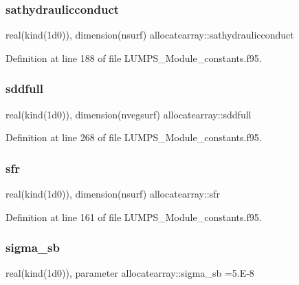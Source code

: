 \subsubsection{\texorpdfstring{sathydraulicconduct}{sathydraulicconduct}}
{\footnotesize\ttfamily real(kind(1d0)), dimension(nsurf) allocatearray\+::sathydraulicconduct}



Definition at line 188 of file L\+U\+M\+P\+S\+\_\+\+Module\+\_\+constants.\+f95.

\mbox{\label{namespaceallocatearray_ab1f90daea4da5dc0660d0ce9aec88a4a}} 
\subsubsection{\texorpdfstring{sddfull}{sddfull}}
{\footnotesize\ttfamily real(kind(1d0)), dimension(nvegsurf) allocatearray\+::sddfull}



Definition at line 268 of file L\+U\+M\+P\+S\+\_\+\+Module\+\_\+constants.\+f95.

\mbox{\label{namespaceallocatearray_a22ef94e8f1becc739e9945560050c844}} 
\subsubsection{\texorpdfstring{sfr}{sfr}}
{\footnotesize\ttfamily real(kind(1d0)), dimension(nsurf) allocatearray\+::sfr}



Definition at line 161 of file L\+U\+M\+P\+S\+\_\+\+Module\+\_\+constants.\+f95.

\mbox{\label{namespaceallocatearray_a91279585f00cf4382f539354751bf02f}} 
\subsubsection{\texorpdfstring{sigma\+\_\+sb}{sigma\_sb}}
{\footnotesize\ttfamily real(kind(1d0)), parameter allocatearray\+::sigma\+\_\+sb =5.\+E-\/8}



